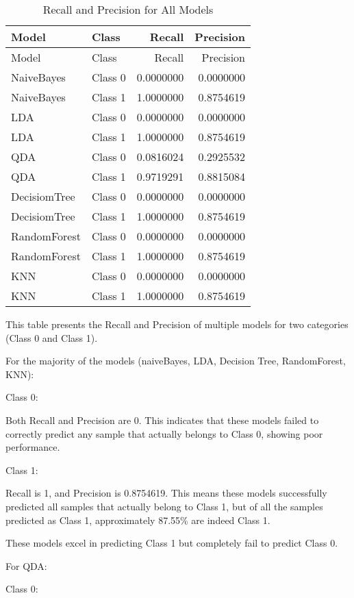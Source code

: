 \documentclass[
]{article}
\begin{document}
\begin{longtable}[]{@{}llrr@{}}
\caption{Recall and Precision for All Models}\tabularnewline
\toprule\noalign{}
Model & Class & Recall & Precision \\
\midrule\noalign{}
\endfirsthead
\toprule\noalign{}
Model & Class & Recall & Precision \\
\midrule\noalign{}
\endhead
\bottomrule\noalign{}
\endlastfoot
NaiveBayes & Class 0 & 0.0000000 & 0.0000000 \\
NaiveBayes & Class 1 & 1.0000000 & 0.8754619 \\
LDA & Class 0 & 0.0000000 & 0.0000000 \\
LDA & Class 1 & 1.0000000 & 0.8754619 \\
QDA & Class 0 & 0.0816024 & 0.2925532 \\
QDA & Class 1 & 0.9719291 & 0.8815084 \\
DecisiomTree & Class 0 & 0.0000000 & 0.0000000 \\
DecisiomTree & Class 1 & 1.0000000 & 0.8754619 \\
RandomForest & Class 0 & 0.0000000 & 0.0000000 \\
RandomForest & Class 1 & 1.0000000 & 0.8754619 \\
KNN & Class 0 & 0.0000000 & 0.0000000 \\
KNN & Class 1 & 1.0000000 & 0.8754619 \\
\end{longtable}

This table presents the Recall and Precision of multiple models for two
categories (Class 0 and Class 1).

For the majority of the models (naiveBayes, LDA, Decision Tree,
RandomForest, KNN):

Class 0:

Both Recall and Precision are 0. This indicates that these models failed
to correctly predict any sample that actually belongs to Class 0,
showing poor performance.

Class 1:

Recall is 1, and Precision is 0.8754619. This means these models
successfully predicted all samples that actually belong to Class 1, but
of all the samples predicted as Class 1, approximately 87.55\% are
indeed Class 1.

These models excel in predicting Class 1 but completely fail to predict
Class 0.

For QDA:

Class 0:
\end{document}
